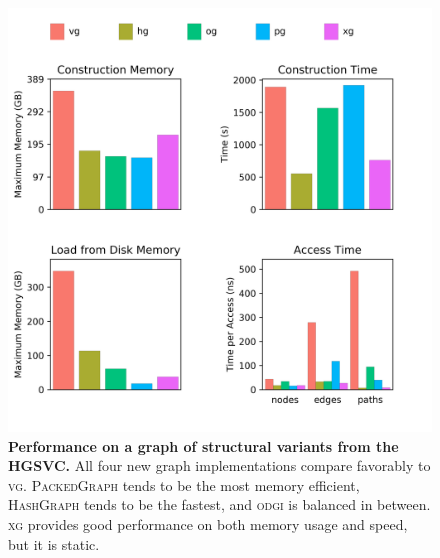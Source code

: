 \documentclass{article}
\begin{document}
\begin{figure}
	\begin{center}
		\includegraphics[width=1.0\textwidth]{figures/HGSVC_sorted_gfa.png}
	\end{center}
	\caption{{\label{fig:hgsvc}
        \textbf{Performance on a graph of structural variants from the HGSVC.}
        All four new graph implementations compare favorably to \textsc{vg}.
        \textsc{PackedGraph} tends to be the most memory efficient, \textsc{HashGraph} tends to be the fastest, and \textsc{odgi} is balanced in between.
        \textsc{xg} provides good performance on both memory usage and speed, but it is static.}}
\end{figure}
\end{document}

